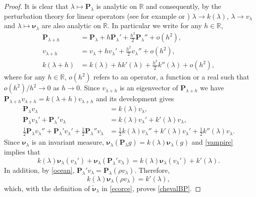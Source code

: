 \documentclass[12pt]{amsart}
\theoremstyle{definition}
\numberwithin{equation}{section}
\def\bb#1{\mathbb{#1}}
\def\bs#1{\boldsymbol{#1}}
\def\bf#1{\mathbf{#1}}
\def\tbs#1{\tilde{\boldsymbol{#1}}}
\renewcommand\ll{\lambda}
\begin{document}
\begin{proof}
It is clear that $\ll \mapsto \bf P_{\ll}$ is analytic on $\bb R$ and consequently, by the  
perturbation theory for linear operators 
(see for example \cite{kato_perturbation_1976} or \cite{dunford_linear_1971}) $\ll \to k(\ll)$, $\ll \to v_{\ll}$ and $\ll \mapsto \bs \nu_{\ll}$ are also analytic on $\bb R$. 
In particular we write for any $h \in \bb R$,
\begin{align*}
	\bf P_{\ll+h} &= \bf P_{\ll} + h \bf P_{\ll}' + \frac{h^2}{2} \bf P_{\ll}'' +  o(h^2), \\
	v_{\ll+h} &= v_{\ll} + h v_{\ll}' + \frac{h^2}{2} v_{\ll}'' + o(h^2), \\
	k(\ll+h) &= k(\ll) + hk'(\ll) + \frac{h^2}{2} k''(\ll) +  o(h^2),
\end{align*}
where for any $h \in \bb R$, $o(h^2)$ refers to an operator, a function or a real such that $o(h^2)/h^2 \to 0$ as $h \to 0$. Since $v_{\ll+h}$ is an eigenvector of $\bf P_{\ll+h}$ we have $\bf P_{\ll+h} v_{\ll+h} = k(\ll+h) v_{\ll+h}$ and its development gives
\begin{align}
	\bf P_{\ll} v_{\ll} &= k(\ll) v_{\ll}, \nonumber\\
	\label{vampire}
	\bf P_{\ll} v_{\ll}' + \bf P_{\ll}' v_{\ll} &= k(\ll) v_{\ll}' + k'(\ll) v_{\ll}, \\
	\label{loupgarou}
	\frac{1}{2} \bf P_{\ll} v_{\ll}'' + \bf P_{\ll}' v_{\ll}' + \frac{1}{2} \bf P_{\ll}'' v_{\ll} &= \frac{1}{2} k(\ll) v_{\ll}'' + k'(\ll) v_{\ll}' + \frac{1}{2} k''(\ll) v_{\ll}.
\end{align}
Since $\bs \nu_{\ll}$ is an invariant measure, $\bs \nu_{\ll} \left( \bf P_{\ll}g \right) = k(\ll) \bs \nu_{\ll} (g)$ and \eqref{vampire} implies that
\[
k(\ll) \bs \nu_{\ll} \left( v_{\ll}' \right) + \bs \nu_{\ll} \left( \bf P_{\ll}' v_{\ll} \right) = k(\ll) \bs \nu_{\ll} \left( v_{\ll}' \right) + k'(\ll).
\]
In addition, by \eqref{ocean}, $\bf P_{\ll}' v_{\ll} = \bf P_{\ll} \left( \rho v_{\ll} \right)$. Therefore,
\[
k(\ll) \bs \nu_{\ll} \left( \rho v_{\ll} \right) = k'(\ll),
\]
which, with the definition of $\tbs \nu_{\ll}$ in \eqref{ecorce}, proves \eqref{chevalBP}.


\end{proof}
\end{document}
